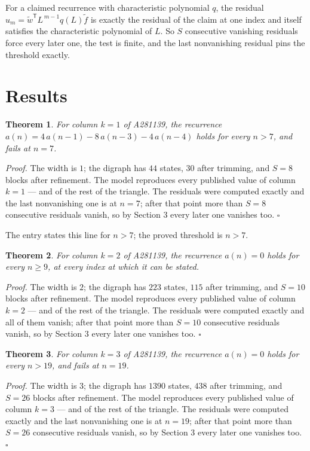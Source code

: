 \documentclass[11pt]{article}
\newtheorem{theorem}{Theorem}
\theoremstyle{definition}
\begin{document}
For a claimed recurrence with characteristic polynomial $q$, the residual $u_m = \tilde w^{\mathsf T}L^{\,m-1}q(L)\tilde f$ is exactly the residual of the claim at one index and itself satisfies the characteristic polynomial of $L$. So $S$ consecutive vanishing residuals force every later one, the test is finite, and the last nonvanishing residual pins the threshold exactly.

\section{Results}

\begin{theorem} For column $k = 1$ of A281139, the recurrence $a(n) = 4\,a(n-1) - 8\,a(n-3) - 4\,a(n-4)$ holds for every $n > 7$, and fails at $n = 7$.\end{theorem}

{\itshape Proof.} The width is $1$; the digraph has $44$ states, $30$ after trimming, and $S = 8$ blocks after refinement. The model reproduces every published value of column $k = 1$ --- and of the rest of the triangle. The residuals were computed exactly and the last nonvanishing one is at $n = 7$; after that point more than $S = 8$ consecutive residuals vanish, so by Section 3 every later one vanishes too. $\square$

The entry states this line for $n > 7$; the proved threshold is $n > 7$.

\begin{theorem} For column $k = 2$ of A281139, the recurrence $a(n) = 0$ holds for every $n \ge 9$, at every index at which it can be stated.\end{theorem}

{\itshape Proof.} The width is $2$; the digraph has $223$ states, $115$ after trimming, and $S = 10$ blocks after refinement. The model reproduces every published value of column $k = 2$ --- and of the rest of the triangle. The residuals were computed exactly and all of them vanish; after that point more than $S = 10$ consecutive residuals vanish, so by Section 3 every later one vanishes too. $\square$

\begin{theorem} For column $k = 3$ of A281139, the recurrence $a(n) = 0$ holds for every $n > 19$, and fails at $n = 19$.\end{theorem}

{\itshape Proof.} The width is $3$; the digraph has $1390$ states, $438$ after trimming, and $S = 26$ blocks after refinement. The model reproduces every published value of column $k = 3$ --- and of the rest of the triangle. The residuals were computed exactly and the last nonvanishing one is at $n = 19$; after that point more than $S = 26$ consecutive residuals vanish, so by Section 3 every later one vanishes too. $\square$
\end{document}
